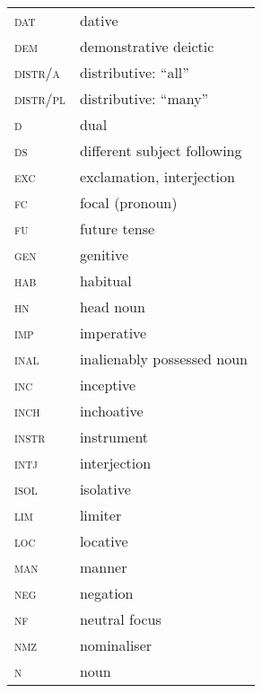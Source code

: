 \begin{tabular}{ll}
\textsc{dat}                            & dative \\
\textsc{dem}                            & demonstrative deictic \\
\textsc{distr/a}                            & distributive: ``all'' \\
\textsc{distr/pl}                            & distributive: ``many'' \\
\textsc{d}                            & dual \\
\textsc{ds}                            & different subject following \\
\textsc{exc}                            & exclamation, interjection \\
\textsc{fc}                            & focal (pronoun) \\
\textsc{fu}                            & future tense \\
\textsc{gen}                            & genitive \\
\textsc{hab}                            & habitual \\
\textsc{hn}                            & head noun \\
\textsc{imp}                            & imperative \\
\textsc{inal}                            & inalienably possessed noun \\
\textsc{inc}                            & inceptive \\
\textsc{inch}                            & inchoative \\
\textsc{instr}                            & instrument \\
\textsc{intj}                            & interjection \\
\textsc{isol}                            & isolative \\
\textsc{lim}                            & limiter \\
\textsc{loc}                            & locative \\
\textsc{man}                            & manner \\
\textsc{neg}                            & negation \\
\textsc{nf}                            & neutral focus \\
\textsc{nmz}                            & nominaliser \\
\textsc{n}                            & noun \\
\end{tabular}

